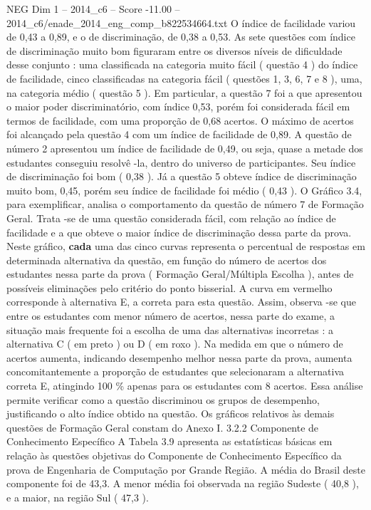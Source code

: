 \begin{textsample}{NEG Dim 1 – 2014\_c6 – Score -11.00 – 2014\_c6/enade\_2014\_eng\_comp\_b822534664.txt}
O índice de facilidade variou de 0,43 a 0,89, e o de discriminação, de 0,38 a 0,53.
As sete questões com índice de discriminação muito bom figuraram entre os diversos níveis de dificuldade desse conjunto : uma classificada na categoria muito fácil ( questão 4 ) do índice de facilidade, cinco classificadas na categoria fácil ( questões 1, 3, 6, 7 e 8 ), uma, na categoria médio ( questão 5 ).
Em particular, a questão 7 foi a que apresentou o maior poder discriminatório, com índice 0,53, porém foi considerada fácil em termos de facilidade, com uma proporção de 0,68 acertos.
O máximo de acertos foi alcançado pela questão 4 com um índice de facilidade de 0,89.
A questão de número 2 apresentou um índice de facilidade de 0,49, ou seja, quase a metade dos estudantes conseguiu resolvê -la, dentro do universo de participantes.
Seu índice de discriminação foi bom ( 0,38 ).
Já a questão 5 obteve índice de discriminação muito bom, 0,45, porém seu índice de facilidade foi médio ( 0,43 ).
O Gráfico 3.4, para exemplificar, analisa o comportamento da questão de número 7 de Formação Geral.
Trata -se de uma questão considerada fácil, com relação ao índice de facilidade e a que obteve o maior índice de discriminação dessa parte da prova.
Neste gráfico, \textbf{cada} uma das cinco curvas representa o percentual de respostas em determinada alternativa da questão, em função do número de acertos dos estudantes nessa parte da prova ( Formação Geral/Múltipla Escolha ), antes de possíveis eliminações pelo critério do ponto bisserial.
A curva em vermelho corresponde à alternativa E, a correta para esta questão.
Assim, observa -se que entre os estudantes com menor número de acertos, nessa parte do exame, a situação mais frequente foi a escolha de uma das alternativas incorretas : a alternativa C ( em preto ) ou D ( em roxo ).
Na medida em que o número de acertos aumenta, indicando desempenho melhor nessa parte da prova, aumenta concomitantemente a proporção de estudantes que selecionaram a alternativa correta E, atingindo 100 \% apenas para os estudantes com 8 acertos.
Essa análise permite verificar como a questão discriminou os grupos de desempenho, justificando o alto índice obtido na questão.
Os gráficos relativos às demais questões de Formação Geral constam do Anexo I. 3.2.2 Componente de Conhecimento Específico A Tabela 3.9 apresenta as estatísticas básicas em relação às questões objetivas do Componente de Conhecimento Específico da prova de Engenharia de Computação por Grande Região.
A média do Brasil deste componente foi de 43,3.
A menor média foi observada na região Sudeste ( 40,8 ), e a maior, na região Sul ( 47,3 ).

\end{textsample}
